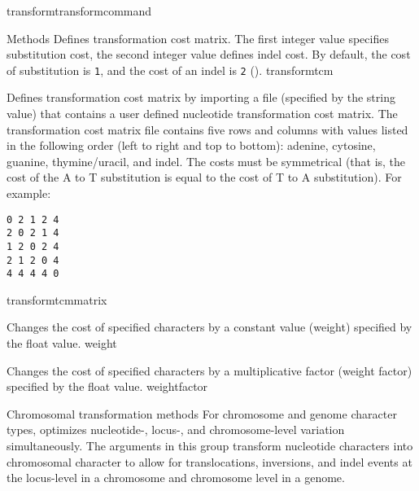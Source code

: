 \begin{command}{transform}{transformcommand}
\begin{arguments}
\begin{argumentgroup}{Methods}
            {Defines transformation cost matrix. The first integer value specifies
            substitution cost, the second integer value defines indel cost. By default,
            the cost of substitution is \texttt{1}, and the cost of an indel is \texttt{2}
            ().}
            {transformtcm}

            {Defines transformation cost matrix by importing a file (specified by
            the string value) that contains a user defined nucleotide
            transformation cost matrix. 
            The transformation cost matrix file contains five rows and columns
            with values listed in the following order (left to right and top to
            bottom): adenine, cytosine, guanine,
            thymine/uracil, and indel. The costs must be symmetrical (that is, the
            cost of the A to T substitution is equal to the cost of T to A
            substitution). For example:
	        \begin{center}
            \texttt{0 2 1 2 4 \\
            2 0 2 1 4 \\
            1 2 0 2 4 \\
            2 1 2 0 4 \\
            4 4 4 4 0} 
            \end{center}
            }
            {transformtcmmatrix}

            {Changes the cost of specified characters by a
            constant value (weight) specified by the float value.} 
            {weight}

            {Changes the cost of specified characters by a
            multiplicative factor (weight factor) specified by the float value.} 
            {weightfactor}

      \end{argumentgroup}
           
       \begin{argumentgroup}{Chromosomal transformation methods}
           For chromosome and genome character types, \poy optimizes nucleotide-, 
           locus-, and chromosome-level variation simultaneously. The arguments in this group
           transform nucleotide characters into chromosomal character
           to allow for translocations, inversions, and indel events at the locus-level in a
           chromosome and chromosome level in a genome.
           

\end{argumentgroup}
\end{arguments}
\end{command}
